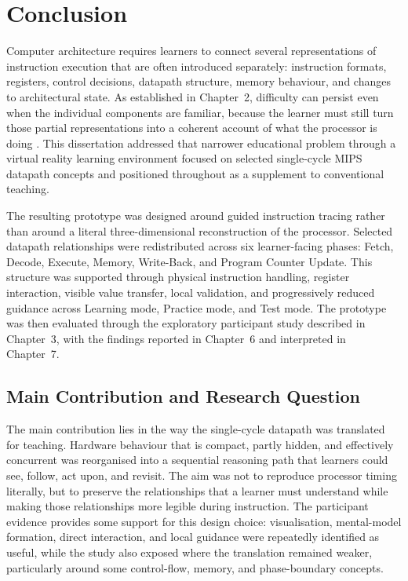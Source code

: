 \chapter{Conclusion}

Computer architecture requires learners to connect several representations of instruction execution that are often introduced separately: instruction formats, registers, control decisions, datapath structure, memory behaviour, and changes to architectural state. As established in Chapter~2, difficulty can persist even when the individual components are familiar, because the learner must still turn those partial representations into a coherent account of what the processor is doing \cite{porter2013evaluating,yehezkel2007contribution}. This dissertation addressed that narrower educational problem through a virtual reality learning environment focused on selected single-cycle MIPS datapath concepts and positioned throughout as a supplement to conventional teaching.

The resulting prototype was designed around guided instruction tracing rather than around a literal three-dimensional reconstruction of the processor. Selected datapath relationships were redistributed across six learner-facing phases: Fetch, Decode, Execute, Memory, Write-Back, and Program Counter Update. This structure was supported through physical instruction handling, register interaction, visible value transfer, local validation, and progressively reduced guidance across Learning mode, Practice mode, and Test mode. The prototype was then evaluated through the exploratory participant study described in Chapter~3, with the findings reported in Chapter~6 and interpreted in Chapter~7.

\section{Main Contribution and Research Question}

The main contribution lies in the way the single-cycle datapath was translated for teaching. Hardware behaviour that is compact, partly hidden, and effectively concurrent was reorganised into a sequential reasoning path that learners could see, follow, act upon, and revisit. The aim was not to reproduce processor timing literally, but to preserve the relationships that a learner must understand while making those relationships more legible during instruction. The participant evidence provides some support for this design choice: visualisation, mental-model formation, direct interaction, and local guidance were repeatedly identified as useful, while the study also exposed where the translation remained weaker, particularly around some control-flow, memory, and phase-boundary concepts.

